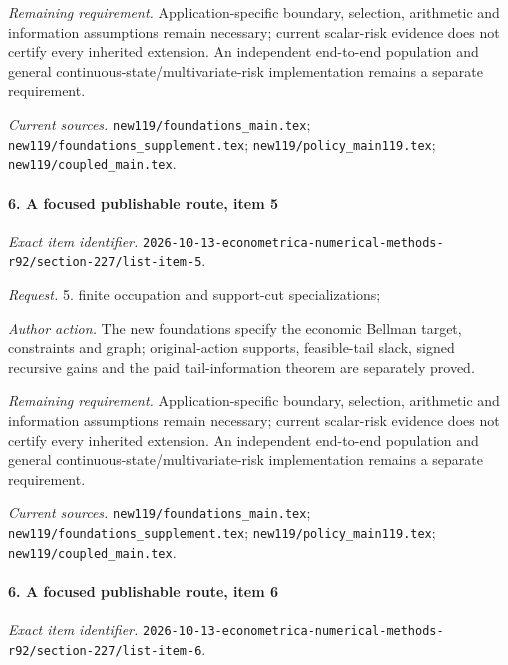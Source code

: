 \par\emph{Remaining requirement.} Application-specific boundary, selection, arithmetic and information assumptions remain necessary; current scalar-risk evidence does not certify every inherited extension. An independent end-to-end population and general continuous-state/\allowbreak{}multivariate-risk implementation remains a separate requirement.

\par\emph{Current sources.} \nolinkurl{new119/foundations_main.tex}; \nolinkurl{new119/foundations_supplement.tex}; \nolinkurl{new119/policy_main119.tex}; \nolinkurl{new119/coupled_main.tex}.

\paragraph{6. A focused publishable route, item 5}

\emph{Exact item identifier.} \nolinkurl{2026-10-13-econometrica-numerical-methods-r92/section-227/list-item-5}.

\par\emph{Request.} 5. finite occupation and support-cut specializations;

\par\emph{Author action.} The new foundations specify the economic Bellman target, constraints and graph; original-action supports, feasible-tail slack, signed recursive gains and the paid tail-information theorem are separately proved.

\par\emph{Remaining requirement.} Application-specific boundary, selection, arithmetic and information assumptions remain necessary; current scalar-risk evidence does not certify every inherited extension. An independent end-to-end population and general continuous-state/\allowbreak{}multivariate-risk implementation remains a separate requirement.

\par\emph{Current sources.} \nolinkurl{new119/foundations_main.tex}; \nolinkurl{new119/foundations_supplement.tex}; \nolinkurl{new119/policy_main119.tex}; \nolinkurl{new119/coupled_main.tex}.

\paragraph{6. A focused publishable route, item 6}

\emph{Exact item identifier.} \nolinkurl{2026-10-13-econometrica-numerical-methods-r92/section-227/list-item-6}.

